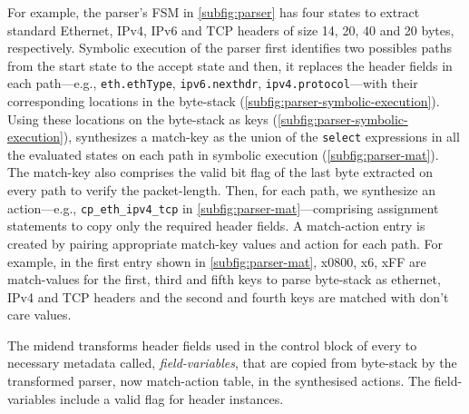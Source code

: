 \documentclass[letterpaper,twocolumn,10pt]{article}
\begin{document}
For example, the parser's FSM in \cref{subfig:parser} has four states
to extract standard Ethernet, IPv4, IPv6 and TCP headers of size 14,
20, 40 and 20 bytes, respectively. Symbolic execution of the parser
first identifies two possibles paths from the start state to the
accept state and then, it replaces the header fields in each path---e.g., \texttt{eth.ethType}, \texttt{ipv6.nexthdr},
\texttt{ipv4.protocol}---with their corresponding locations in the
byte-stack (\cref{subfig:parser-symbolic-execution}).
Using these locations on the byte-stack as keys (\cref{subfig:parser-symbolic-execution}), \ucomp
synthesizes a match-key as the union of the \texttt{select}
expressions in all the evaluated states on each path in symbolic
execution (\cref{subfig:parser-mat}). The match-key also comprises the
valid bit flag of the last byte extracted on every path to verify the
packet-length. Then, for each path, we synthesize an
action---e.g., \texttt{cp\_eth\_ipv4\_tcp} in
\cref{subfig:parser-mat}---comprising assignment statements to copy
only the required header fields. A match-action entry is created by
pairing appropriate match-key values and action for each path.
For example, in the first entry shown in \cref{subfig:parser-mat},
x0800, x6, xFF are match-values for the first, third and fifth keys to
parse byte-stack as ethernet, IPv4 and TCP headers and the second and
fourth keys are matched with don't care values.

The midend transforms header fields used in the control block of every
\uprogram to necessary metadata called, \emph{field-variables}, that
are copied from  byte-stack by the transformed parser, now
match-action table, in the synthesised actions. The field-variables
include a valid flag for header instances.
\end{document}

